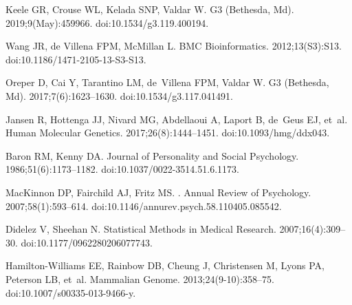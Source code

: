 \documentclass[10pt,letterpaper,twoside]{article}
\begin{document}
\begin{thebibliography}{10}

Keele GR, Crouse WL, Kelada SNP, Valdar W.
\newblock G3 (Bethesda, Md). 2019;9(May):459966.
\newblock doi:{10.1534/g3.119.400194}.

Wang JR, de Villena FPM, McMillan L.
\newblock BMC Bioinformatics. 2012;13(S3):S13.
\newblock doi:{10.1186/1471-2105-13-S3-S13}.

Oreper D, Cai Y, Tarantino LM, de~Villena FPM, Valdar W.
\newblock G3 (Bethesda, Md). 2017;7(6):1623--1630.
\newblock doi:{10.1534/g3.117.041491}.

Jansen R, Hottenga JJ, Nivard MG, Abdellaoui A, Laport B, de~Geus EJ, et~al.
\newblock Human Molecular Genetics. 2017;26(8):1444--1451.
\newblock doi:{10.1093/hmg/ddx043}.

Baron RM, Kenny DA.
\newblock Journal of Personality and Social Psychology. 1986;51(6):1173--1182.
\newblock doi:{10.1037/0022-3514.51.6.1173}.

MacKinnon DP, Fairchild AJ, Fritz MS.
.
\newblock Annual Review of Psychology. 2007;58(1):593--614.
\newblock doi:{10.1146/annurev.psych.58.110405.085542}.

Didelez V, Sheehan N.
\newblock Statistical Methods in Medical Research. 2007;16(4):309--30.
\newblock doi:{10.1177/0962280206077743}.

Hamilton-Williams EE, Rainbow DB, Cheung J, Christensen M, Lyons PA, Peterson
  LB, et~al.
\newblock Mammalian Genome. 2013;24(9-10):358--75.
\newblock doi:{10.1007/s00335-013-9466-y}.

\end{thebibliography}
\end{document}
